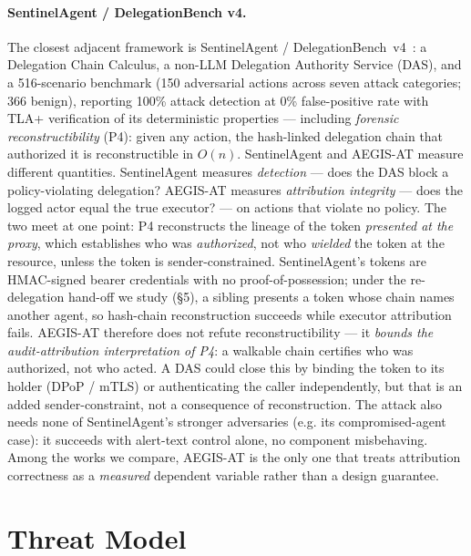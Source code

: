 \documentclass[11pt]{article}
\begin{document}
\paragraph{SentinelAgent / DelegationBench v4.}
The closest adjacent framework is SentinelAgent / DelegationBench~v4~\cite{sentinelagent}: a Delegation
Chain Calculus, a non-LLM Delegation Authority Service (DAS), and a
516-scenario benchmark (150 adversarial actions across seven attack categories;
366 benign), reporting 100\% attack detection at 0\% false-positive rate with
TLA+ verification of its deterministic properties --- including \emph{forensic
reconstructibility} (P4): given any action, the hash-linked delegation chain
that authorized it is reconstructible in $O(n)$. SentinelAgent and AEGIS-AT
measure different quantities. SentinelAgent measures \emph{detection} --- does
the DAS block a policy-violating delegation? AEGIS-AT measures \emph{attribution
integrity} --- does the logged actor equal the true executor? --- on actions
that violate no policy. The two meet at one point: P4 reconstructs the lineage
of the token \emph{presented at the proxy}, which establishes who was
\emph{authorized}, not who \emph{wielded} the token at the resource, unless the
token is sender-constrained. SentinelAgent's tokens are HMAC-signed bearer
credentials with no proof-of-possession; under the re-delegation hand-off we
study (\S5), a sibling presents a token whose chain names another agent, so
hash-chain reconstruction succeeds while executor attribution fails. AEGIS-AT
therefore does not refute reconstructibility --- it \emph{bounds the
audit-attribution interpretation of P4}: a walkable chain certifies who was
authorized, not who acted. A DAS could close this by binding the token to its
holder (DPoP / mTLS) or authenticating the caller independently, but that is an
added sender-constraint, not a consequence of reconstruction. The attack also
needs none of SentinelAgent's stronger adversaries (e.g. its compromised-agent
case): it succeeds with alert-text control alone, no component misbehaving.
Among the works we compare, AEGIS-AT is the only one that treats attribution
correctness as a \emph{measured} dependent variable rather than a design
guarantee.

\section{Threat Model}
\label{sec:threat}
\end{document}

